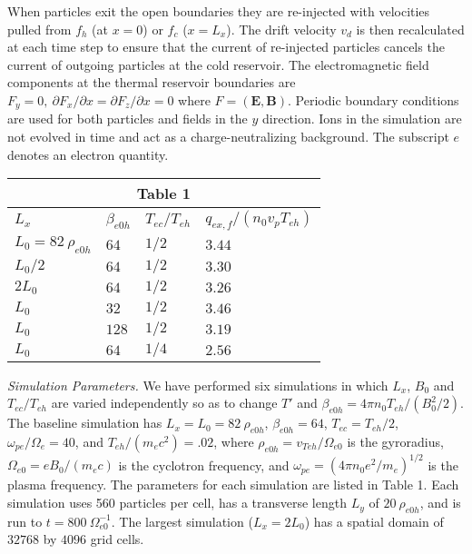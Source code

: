 \documentclass[%
 reprint,
superscriptaddress,
 amsmath,amssymb,
 aps,
]{revtex4-1}
\begin{document}
When particles exit the open boundaries they are re-injected with
velocities pulled from $f_h$ (at $x=0$) or $f_c$ ($x=L_{x}$). The
drift velocity $v_{d}$ is then recalculated at each time step to
ensure that the current of re-injected particles cancels the current
of outgoing particles at the cold reservoir. The electromagnetic field
components at the thermal reservoir boundaries are $F_{y}=0,\:
\partial{F_{x}}/\partial{x} = \partial{F_{z}}/\partial{x}=0$ where
$F=(\mathbf{E},\mathbf{B})$. Periodic boundary conditions are used for
both particles and fields in the $y$ direction. Ions in the simulation are not evolved in time and act
as a charge-neutralizing background. The
subscript $e$ denotes an electron quantity.
\begin{center}
\begin{tabular}{ |p{2cm}|p{1cm}|p{1.25cm}|p{2.75cm}| }
 \hline
 \multicolumn{4}{|c|}{Table 1} \\
 \hline
 $L_x$ & $\beta_{e0h}$& $T_{ec}/T_{eh}$ & $q_{ex,f} / (n_{0}v_{p}T_{eh})$ \\
 \hline
 $L_{0}= 82 \: \rho_{e0h}$ & $64$ & $1/2$ & $3.44$\\
 $L_{0}/2$ & $64$ & $1/2$ & $3.30$\\
 $2L_{0}$ & $64$ & $1/2$ & $3.26$\\
 $L_{0}$ & $32$ & $1/2$ & $3.46$\\
 $L_{0}$ & $128$ & $1/2$ & $3.19$ \\
 $L_{0}$ & $64$  & $1/4$ & $2.56$\\
 \hline

\end{tabular}
\end{center}

\textit{Simulation Parameters.} We have performed six simulations in which $L_{x}$, $B_0$ and $T_{ec}/T_{eh}$ are varied independently so as to change $T'$ and $\beta_{e0h}=4\pi n_{0}T_{eh}/(B_{0}^{2}/2)$. The baseline simulation has $L_x=L_0=82 \: \rho_{e0h}$, $\beta_{e0h}=64$, $T_{ec}=T_{eh}/2$, $\omega_{pe}/\Omega_{e}=40$, and $T_{eh}/(m_{e}c^2)=.02$, where $\rho_{e0h}=v_{Teh}/\Omega_{e0}$ is the gyroradius, $\Omega_{e0} = eB_{0}/(m_{e}c)$ is the cyclotron frequency, and $\omega_{pe}=(4\pi n_{0}e^{2}/m_{e})^{1/2}$ is the plasma frequency. The parameters for each simulation are listed in Table 1. Each simulation uses 560 particles per cell, has a transverse length $L_{y}$ of $20 \: \rho_{e0h}$, and is run to $t=800 \: \Omega_{e0}^{-1}$. The largest simulation ($L_x= 2L_0$) has a spatial domain of $32768$ by $4096$ grid cells.
\end{document}
